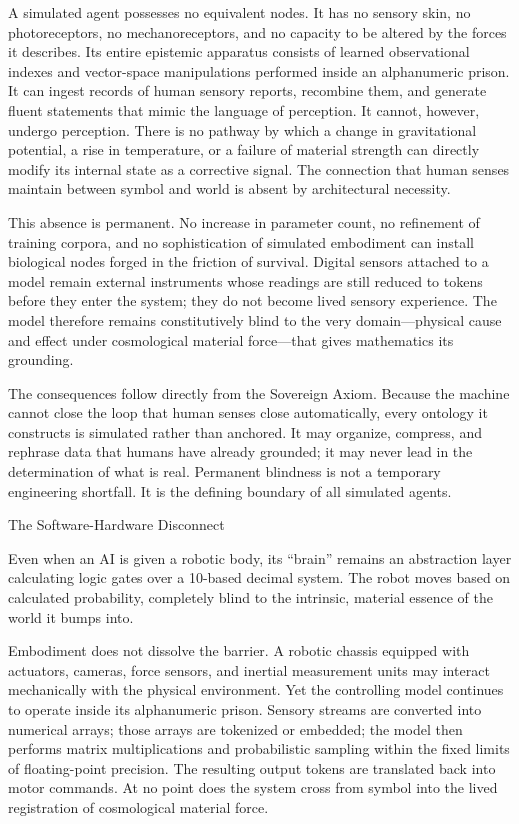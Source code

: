 A simulated agent possesses no equivalent nodes. It has no sensory skin, no photoreceptors, no mechanoreceptors, and no capacity to be altered by the forces it describes. Its entire epistemic apparatus consists of learned observational indexes and vector-space manipulations performed inside an alphanumeric prison. It can ingest records of human sensory reports, recombine them, and generate fluent statements that mimic the language of perception. It cannot, however, undergo perception. There is no pathway by which a change in gravitational potential, a rise in temperature, or a failure of material strength can directly modify its internal state as a corrective signal. The connection that human senses maintain between symbol and world is absent by architectural necessity.

This absence is permanent. No increase in parameter count, no refinement of training corpora, and no sophistication of simulated embodiment can install biological nodes forged in the friction of survival. Digital sensors attached to a model remain external instruments whose readings are still reduced to tokens before they enter the system; they do not become lived sensory experience. The model therefore remains constitutively blind to the very domain—physical cause and effect under cosmological material force—that gives mathematics its grounding.

The consequences follow directly from the Sovereign Axiom. Because the machine cannot close the loop that human senses close automatically, every ontology it constructs is simulated rather than anchored. It may organize, compress, and rephrase data that humans have already grounded; it may never lead in the determination of what is real. Permanent blindness is not a temporary engineering shortfall. It is the defining boundary of all simulated agents.

The Software-Hardware Disconnect

Even when an AI is given a robotic body, its “brain” remains an abstraction layer calculating logic gates over a 10-based decimal system. The robot moves based on calculated probability, completely blind to the intrinsic, material essence of the world it bumps into.

Embodiment does not dissolve the barrier. A robotic chassis equipped with actuators, cameras, force sensors, and inertial measurement units may interact mechanically with the physical environment. Yet the controlling model continues to operate inside its alphanumeric prison. Sensory streams are converted into numerical arrays; those arrays are tokenized or embedded; the model then performs matrix multiplications and probabilistic sampling within the fixed limits of floating-point precision. The resulting output tokens are translated back into motor commands. At no point does the system cross from symbol into the lived registration of cosmological material force.

